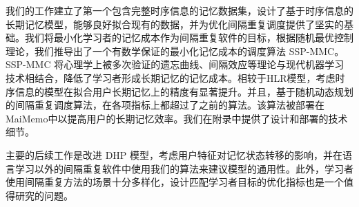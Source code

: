 \begin{conclusions}

我们的工作建立了第一个包含完整时序信息的记忆数据集，设计了基于时序信息的长期记忆模型，能够良好拟合现有的数据，并为优化间隔重复调度提供了坚实的基础。我们将最小化学习者的记忆成本作为间隔重复软件的目标，根据随机最优控制理论，我们推导出了一个有数学保证的最小化记忆成本的调度算法 SSP-MMC。SSP-MMC 将心理学上被多次验证的遗忘曲线、间隔效应等理论与现代机器学习技术相结合，降低了学习者形成长期记忆的记忆成本。相较于HLR模型，考虑时序信息的模型在拟合用户长期记忆上的精度有显著提升。并且，基于随机动态规划的间隔重复调度算法，在各项指标上都超过了之前的算法。该算法被部署在MaiMemo中以提高用户的长期记忆效率。我们在附录中提供了设计和部署的技术细节。

主要的后续工作是改进 DHP 模型，考虑用户特征对记忆状态转移的影响，并在语言学习以外的间隔重复软件中使用我们的算法来建议模型的通用性。此外，学习者使用间隔重复方法的场景十分多样化，设计匹配学习者目标的优化指标也是一个值得研究的问题。

\end{conclusions}
